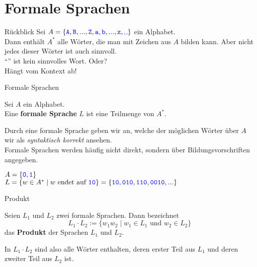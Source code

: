 \section{Formale Sprachen}

\begin{frame}{Rückblick}
	Sei $A = \{\word A, \word B, ..., \word Z, \word a, \word b, ..., \word z, \word\sp\}$ ein Alphabet.\\
	\pause
	Dann enthält $A^*$ alle Wörter, die man mit Zeichen aus $A$ bilden kann. Aber nicht jedes dieser Wörter ist auch sinnvoll.\\[1em]
	
	\enquote{} ist kein sinnvolles Wort. \pause Oder? \\[1em]
	\pause
	\impl Hängt vom Kontext ab!\\
	
\end{frame}

\begin{frame}{Formale Sprachen}
		\begin{Definition}
			Sei $A$ ein Alphabet.\\
			Eine \textbf{formale Sprache} $L$ ist eine Teilmenge von $A^*$.
		\end{Definition}
		\pause
		\vspace{10pt}
		Durch eine formale Sprache geben wir an, welche der möglichen Wörter über $A$ wir als  \emph{syntaktisch korrekt} ansehen.\\
		\pause
		Formale Sprachen werden häufig nicht direkt, sondern über Bildungsvorschriften angegeben.
		
		\pause
		\begin{Beispiel}
			$A = \{\hbox{\textcolor{blue}{\texttt{0}}}, \hbox{\textcolor{blue}{\texttt{1}}}\}$ \\
			$L = \{ w \in A^* \mid w \text{ endet auf } \hbox{\textcolor{blue}{\texttt{10}}} \}  = \{\hbox{\textcolor{blue}{\texttt{10}}}, \hbox{\textcolor{blue}{\texttt{010}}}, \hbox{\textcolor{blue}{\texttt{110}}}, \hbox{\textcolor{blue}{\texttt{0010}}}, ...\}$
		\end{Beispiel}
\end{frame}







\begin{frame}{Produkt}
		\begin{Definition}
			Seien $L_1$ und $L_2$ zwei formale Sprachen. Dann bezeichnet
				$$L_1 \cdot L_2 := \{w_1 w_2 \mid w_1 \in L_1 \text{ und } w_2 \in L_2 \}$$
				das \textbf{Produkt} der Sprachen $L_1$ und $L_2$.
		\end{Definition}
		\pause
		In $L_1 \cdot L_2$ sind also alle Wörter enthalten, deren erster Teil aus $L_1$ und deren zweiter Teil aus $L_2$ ist.
	
\end{frame}

